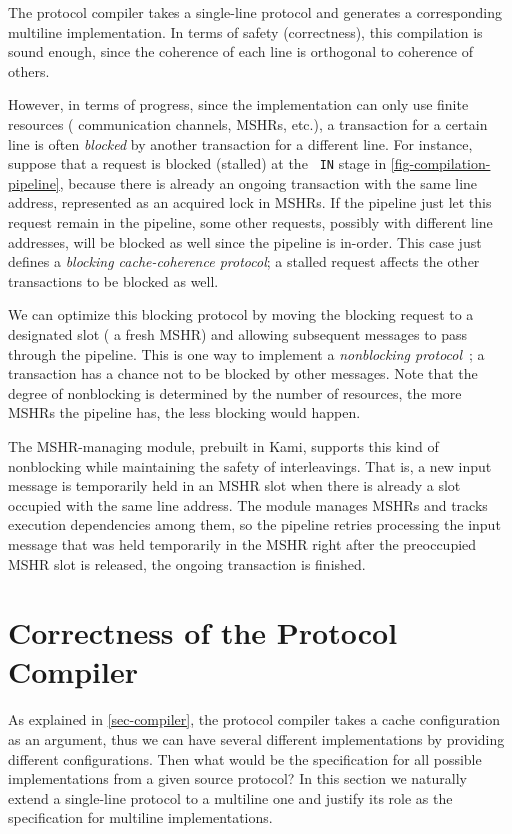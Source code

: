 The protocol compiler takes a single-line \hemiola{} protocol and generates a corresponding multiline implementation.
In terms of safety (correctness), this compilation is sound enough, since the coherence of each line is orthogonal to coherence of others.

However, in terms of progress, since the implementation can only use finite resources (\eg{} communication channels, MSHRs, etc.), a transaction for a certain line is often \emph{blocked} by another transaction for a different line.
For instance, suppose that a request is blocked (stalled) at the {\small\tt\color{myblue} IN} stage in \autoref{fig-compilation-pipeline}, because there is already an ongoing transaction with the same line address, represented as an acquired lock in MSHRs.
If the pipeline just let this request remain in the pipeline, some other requests, possibly with different line addresses, will be blocked as well since the pipeline is in-order.
This case just defines a \emph{blocking cache-coherence protocol}; a stalled request affects the other transactions to be blocked as well.

We can optimize this blocking protocol by moving the blocking request to a designated slot (\eg{} a fresh MSHR) and allowing subsequent messages to pass through the pipeline.
This is one way to implement a \emph{nonblocking protocol}~\cite{cacheNonblocking,cacheNonblocking2,cacheNonblocking3}; a transaction has a chance not to be blocked by other messages.
Note that the degree of nonblocking is determined by the number of resources, \eg{} the more MSHRs the pipeline has, the less blocking would happen.

The MSHR-managing module, prebuilt in Kami, supports this kind of nonblocking while maintaining the safety of interleavings.
That is, a new input message is temporarily held in an MSHR slot when there is already a slot occupied with the same line address.
The module manages MSHRs and tracks execution dependencies among them, so the pipeline retries processing the input message that was held temporarily in the MSHR right after the preoccupied MSHR slot is released, \ie{} the ongoing transaction is finished.

\section{Correctness of the Protocol Compiler}
\label{sec-compiler-correctness}

As explained in \autoref{sec-compiler}, the protocol compiler takes a cache configuration as an argument, thus we can have several different implementations by providing different configurations.
Then what would be the specification for all possible implementations from a given source protocol?
In this section we naturally extend a single-line \hemiola{} protocol to a multiline one and justify its role as the specification for multiline implementations.

